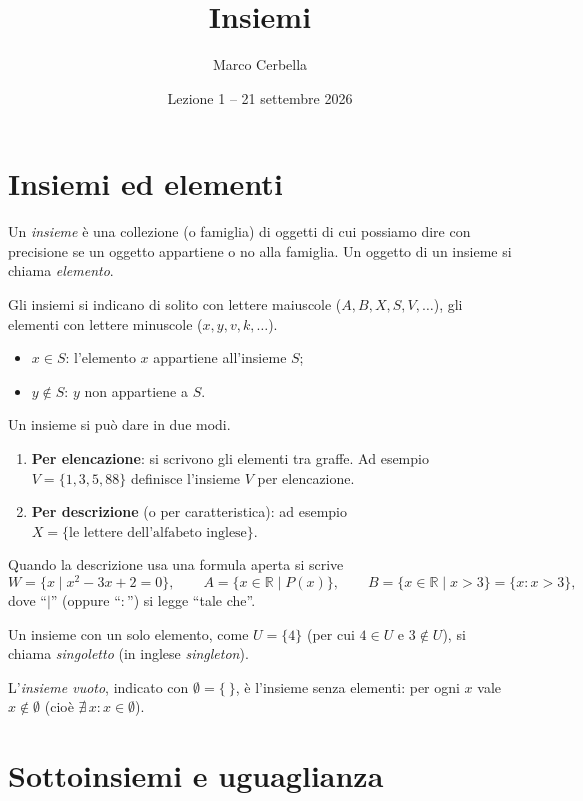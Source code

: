 \documentclass[11pt,a4paper]{article}
\title{Insiemi}
\author{Marco Cerbella}
\date{Lezione 1 -- 21 settembre 2026}
\begin{document}
\maketitle

\section{Insiemi ed elementi}

\begin{definizione}
Un \emph{insieme} è una collezione (o famiglia) di oggetti di cui possiamo
dire con precisione se un oggetto appartiene o no alla famiglia. Un oggetto
di un insieme si chiama \emph{elemento}.
\end{definizione}

Gli insiemi si indicano di solito con lettere maiuscole ($A, B, X, S, V,
\dots$), gli elementi con lettere minuscole ($x, y, v, k, \dots$).
\begin{itemize}
    \item $x \in S$: l'elemento $x$ appartiene all'insieme $S$;
    \item $y \notin S$: $y$ non appartiene a $S$.
\end{itemize}

Un insieme si può dare in due modi.
\begin{enumerate}
    \item \textbf{Per elencazione}: si scrivono gli elementi tra graffe.
          Ad esempio $V = \{1, 3, 5, 88\}$ definisce l'insieme $V$ per
          elencazione.
    \item \textbf{Per descrizione} (o per caratteristica): ad esempio
          $X = \{\text{le lettere dell'alfabeto inglese}\}$.
\end{enumerate}

Quando la descrizione usa una formula aperta si scrive
\[
W = \{x \mid x^2 - 3x + 2 = 0\}, \qquad
A = \{x \in \mathbb{R} \mid P(x)\}, \qquad
B = \{x \in \mathbb{R} \mid x > 3\} = \{x : x > 3\},
\]
dove ``$\mid$'' (oppure ``$:$'') si legge ``tale che''.

Un insieme con un solo elemento, come $U = \{4\}$ (per cui $4 \in U$ e
$3 \notin U$), si chiama \emph{singoletto} (in inglese \emph{singleton}).

L'\emph{insieme vuoto}, indicato con $\emptyset = \{\ \}$, è l'insieme senza
elementi: per ogni $x$ vale $x \notin \emptyset$ (cioè
$\nexists\, x : x \in \emptyset$).

\section{Sottoinsiemi e uguaglianza}
\end{document}
